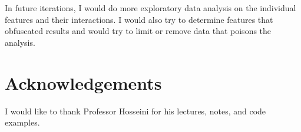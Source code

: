 \documentclass[11pt]{amsart}
\begin{document}
In future iterations, I would do more exploratory data analysis on the individual features and their interactions. I would also try to determine features 
that obfuscated results and would try to limit or remove data that poisons the analysis. 

\section*{Acknowledgements}

I would like to thank Professor Hosseini for his lectures, notes, and code examples.



\end{document}
